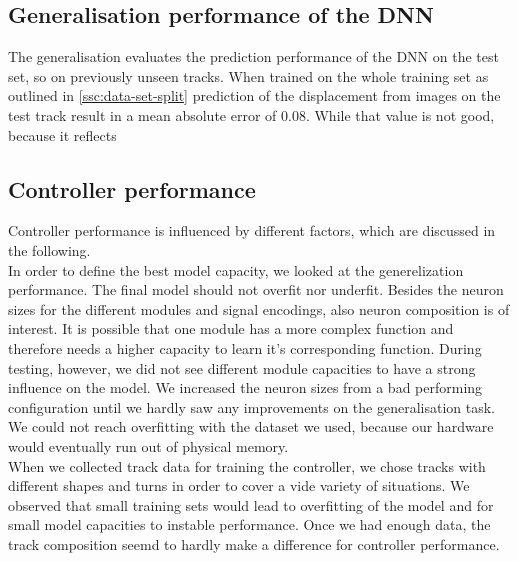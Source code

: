 \documentclass[10pt,a4paper,twoside,journal]{IEEEtran}
\begin{document}
\subsection{Generalisation performance of the DNN}
\label{ssc:generalisation}
The generalisation evaluates the prediction performance of the DNN on the test set, so on previously unseen tracks. When trained on the whole training set as outlined in \autoref{ssc:data-set-split} prediction of the displacement from images on the test track result in a mean absolute error of 0.08. While that value is not good, because it reflects 


\subsection{Controller performance}
Controller performance is influenced by different factors, which are discussed in the following. \\
In order to define the best model capacity, we looked at the generelization performance. The final model should not overfit nor underfit. Besides the neuron sizes for the different modules and signal encodings, also neuron composition is of interest. It is possible that one module has a more complex function and therefore needs a higher capacity to learn it's corresponding function. During testing, however, we did not see different module capacities to have a strong influence on the model. We increased the neuron sizes from a bad performing configuration until we hardly saw any improvements on the generalisation task. We could not reach overfitting with the dataset we used, because our hardware would eventually run out of physical memory.\\
When we collected track data for training the controller, we chose tracks with different shapes and turns in order to cover a vide variety of situations. We observed that small training sets would lead to overfitting of the model and for small model capacities to instable performance. Once we had enough data, the track composition seemd to hardly make a difference for controller performance. \\
\end{document}
